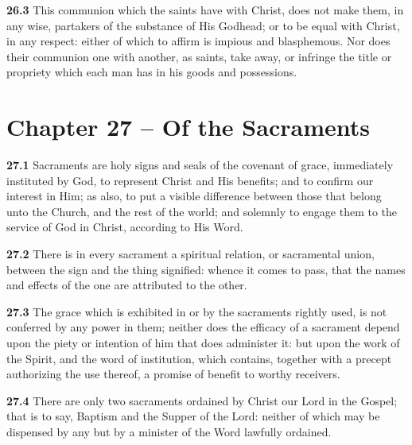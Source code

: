 \par\textbf{26.3} This communion which the saints have with Christ, does not make them, in any wise, partakers of the substance of His Godhead; or to be equal with Christ, in any respect: either of which to affirm is impious and blasphemous. Nor does their communion one with another, as saints, take away, or infringe the title or propriety which each man has in his goods and possessions.  

\section{Chapter 27 -- Of the Sacraments}

\par\textbf{27.1} Sacraments are holy signs and seals of the covenant of grace, immediately instituted by God, to represent Christ and His benefits; and to confirm our interest in Him; as also, to put a visible difference between those that belong unto the Church, and the rest of the world; and solemnly to engage them to the service of God in Christ, according to His Word.   

\par\textbf{27.2} There is in every sacrament a spiritual relation, or sacramental union, between the sign and the thing signified: whence it comes to pass, that the names and effects of the one are attributed to the other.   

\par\textbf{27.3} The grace which is exhibited in or by the sacraments rightly used, is not conferred by any power in them; neither does the efficacy of a sacrament depend upon the piety or intention of him that does administer it: but upon the work of the Spirit, and the word of institution, which contains, together with a precept authorizing the use thereof, a promise of benefit to worthy receivers.   

\par\textbf{27.4} There are only two sacraments ordained by Christ our Lord in the Gospel; that is to say, Baptism and the Supper of the Lord: neither of which may be dispensed by any but by a minister of the Word lawfully ordained.   

